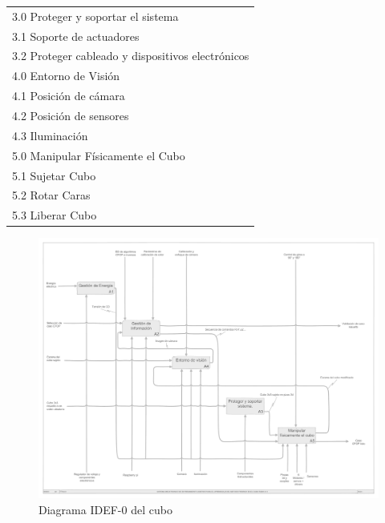 \begin{table}[H]
\begin{tabular}{l}
3.0 \; Proteger y soportar el sistema \\
\hspace{0.5cm} 3.1 \; Soporte de actuadores \\
\hspace{0.5cm} 3.2 \; Proteger cableado y dispositivos electrónicos \\\hline
4.0 \; Entorno de Visión \\
\hspace{0.5cm} 4.1 \; Posición de cámara \\
\hspace{0.5cm} 4.2 \; Posición de sensores \\
\hspace{0.5cm} 4.3 \; Iluminación \\\hline
5.0 \; Manipular Físicamente el Cubo \\
\hspace{0.5cm} 5.1 \; Sujetar Cubo \\
\hspace{0.5cm} 5.2 \; Rotar Caras \\
\hspace{0.5cm} 5.3 \; Liberar Cubo \\\hline
\end{tabular}%
\end{table}
\renewcommand{\arraystretch}{1.0} %



\begin{figure}[H]
    \centering
    \includegraphics[height=\textwidth,angle=90]{img/idef-0-cubo.pdf} %
    \caption{Diagrama IDEF-0 del cubo}
    \label{fig:idef0cubo}
\end{figure}

\\